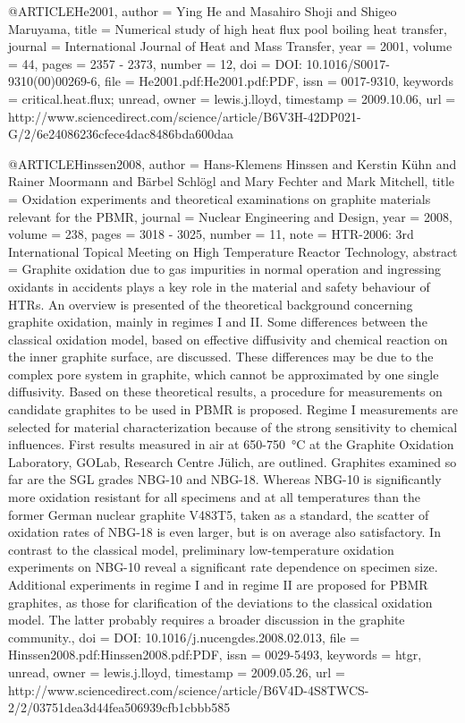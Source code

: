 {@ARTICLE{He2001,
  author = {Ying He and Masahiro Shoji and Shigeo Maruyama},
  title = {Numerical study of high heat flux pool boiling heat transfer},
  journal = {International Journal of Heat and Mass Transfer},
  year = {2001},
  volume = {44},
  pages = {2357 - 2373},
  number = {12},
  doi = {DOI: 10.1016/S0017-9310(00)00269-6},
  file = {He2001.pdf:He2001.pdf:PDF},
  issn = {0017-9310},
  keywords = {critical.heat.flux; unread},
  owner = {lewis.j.lloyd},
  timestamp = {2009.10.06},
  url = {http://www.sciencedirect.com/science/article/B6V3H-42DP021-G/2/6e24086236cfece4dac8486bda600daa}
}

@ARTICLE{Hinssen2008,
  author = {Hans-Klemens Hinssen and Kerstin Kühn and Rainer Moormann and Bärbel
	Schlögl and Mary Fechter and Mark Mitchell},
  title = {Oxidation experiments and theoretical examinations on graphite materials
	relevant for the PBMR},
  journal = {Nuclear Engineering and Design},
  year = {2008},
  volume = {238},
  pages = {3018 - 3025},
  number = {11},
  note = {HTR-2006: 3rd International Topical Meeting on High Temperature Reactor
	Technology},
  abstract = {Graphite oxidation due to gas impurities in normal operation and ingressing
	oxidants in accidents plays a key role in the material and safety
	behaviour of HTRs. An overview is presented of the theoretical background
	concerning graphite oxidation, mainly in regimes I and II. Some differences
	between the classical oxidation model, based on effective diffusivity
	and chemical reaction on the inner graphite surface, are discussed.
	These differences may be due to the complex pore system in graphite,
	which cannot be approximated by one single diffusivity. Based on
	these theoretical results, a procedure for measurements on candidate
	graphites to be used in PBMR is proposed. Regime I measurements are
	selected for material characterization because of the strong sensitivity
	to chemical influences. First results measured in air at 650-750 °C
	at the Graphite Oxidation Laboratory, GOLab, Research Centre Jülich,
	are outlined. Graphites examined so far are the SGL grades NBG-10
	and NBG-18. Whereas NBG-10 is significantly more oxidation resistant
	for all specimens and at all temperatures than the former German
	nuclear graphite V483T5, taken as a standard, the scatter of oxidation
	rates of NBG-18 is even larger, but is on average also satisfactory.
	In contrast to the classical model, preliminary low-temperature oxidation
	experiments on NBG-10 reveal a significant rate dependence on specimen
	size. Additional experiments in regime I and in regime II are proposed
	for PBMR graphites, as those for clarification of the deviations
	to the classical oxidation model. The latter probably requires a
	broader discussion in the graphite community.},
  doi = {DOI: 10.1016/j.nucengdes.2008.02.013},
  file = {Hinssen2008.pdf:Hinssen2008.pdf:PDF},
  issn = {0029-5493},
  keywords = {htgr, unread},
  owner = {lewis.j.lloyd},
  timestamp = {2009.05.26},
  url = {http://www.sciencedirect.com/science/article/B6V4D-4S8TWCS-2/2/03751dea3d44fea506939cfb1cbbb585}
}

}

